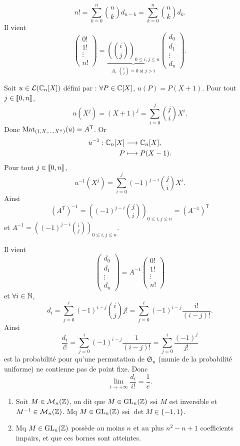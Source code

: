 \begin{solution}
\[
n!=\sum_{k=0}^n\binom nkd_{n-k}=\sum_{k=0}^n\binom nkd_k.
\]
Il vient
\[
\begin{pmatrix}0!\\1!\\\vdots\\n!\end{pmatrix}
=\underbrace{\left(\binom ij\right)_{0\leq i,j\leq n}}_{A,
\ \binom ij=0\text{ si }j>i}
\begin{pmatrix}d_0\\d_1\\\vdots\\d_n\end{pmatrix}.
\]

Soit $u\in\mathcal L(\mathbb C_n[X])$ défini par : $\forall P\in\mathbb C[X]$,
$u(P)=P(X+1)$. Pour tout $j\in\llbracket 0,n\rrbracket$,
\[
u(X^j)=(X+1)^j=\sum_{i=0}^j\binom jiX^i.
\]
Donc $\operatorname{Mat}_{(1,X,\ldots,X^n)}(u)=A^{\mathsf T}$. Or
\[
\begin{aligned}u^{-1}:\mathbb C_n[X]&\longrightarrow\mathbb C_n[X],\\P&\longmapsto P(X-1).
\end{aligned}
\]
Pour tout $j\in\llbracket 0,n\rrbracket$,
\[
u^{-1}(X^j)=\sum_{i=0}^j(-1)^{j-i}\binom jiX^i.
\]
Ainsi
\[
(A^{\mathsf T})^{-1}=\left((-1)^{j-i}\binom ji\right)_{0\leq i,j\leq n}
=(A^{-1})^{\mathsf T}
\]
et $A^{-1}=\left((-1)^{j-i}\binom ij\right)_{0\leq i,j\leq n}$.

Il vient
\[
\begin{pmatrix}d_0\\d_1\\\vdots\\d_n\end{pmatrix}
=A^{-1}\begin{pmatrix}0!\\1!\\\vdots\\n!\end{pmatrix}
\]
et $\forall i\in\mathbb N$,
\[
d_i=\sum_{j=0}^i(-1)^{i-j}\binom ijj!
=\sum_{j=0}^i(-1)^{i-j}\frac{i!}{(i-j)!}.
\]
Ainsi
\[
\frac{d_i}{i!}=\sum_{j=0}^i(-1)^{i-j}\frac1{(i-j)!}
=\sum_{j=0}^i\frac{(-1)^j}{j!}
\]
est la probabilité pour qu'une permutation de $\mathfrak S_n$ (munie de la probabilité
uniforme) ne contienne pas de point fixe. Donc
\[
\boxed{\lim_{i\to+\infty}\frac{d_i}{i!}=\frac1e.}
\]
\end{solution}


\begin{statementbox}
\begin{enumerate}[label=\alph*.]
  \item Soit $M\in\mathcal M_n(\mathbb Z)$, on dit que $M\in\operatorname{GL}_n(\mathbb Z)$ ssi $M$ est inversible et
  $M^{-1}\in\mathcal M_n(\mathbb Z)$. Mq $M\in\operatorname{GL}_n(\mathbb Z)$ ssi $\det M\in\{-1,1\}$.
  \item Mq $M\in\operatorname{GL}_n(\mathbb Z)$ possède au moins $n$ et au plus $n^2-n+1$ coefficients
  impairs, et que ces bornes sont atteintes.
\end{enumerate}
\end{statementbox}

